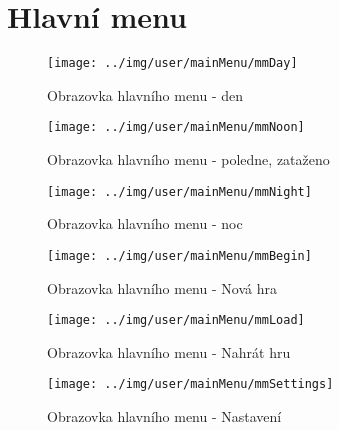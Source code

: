 
\section{Hlavní menu}



\begin{figure}[h!]\centering
\texttt{[image: ../img/user/mainMenu/mmDay]}

\caption{Obrazovka hlavního menu - den}
\label{fig:user_mainMenu_mmDay}

\end{figure}

\begin{figure}[h!]\centering
\texttt{[image: ../img/user/mainMenu/mmNoon]}

\caption{Obrazovka hlavního menu - poledne, zataženo}
\label{fig:user_mainMenu_mmNoon}

\end{figure}

\begin{figure}[h!]\centering
\texttt{[image: ../img/user/mainMenu/mmNight]}

\caption{Obrazovka hlavního menu - noc}
\label{fig:user_mainMenu_mmNight}

\end{figure}


\begin{figure}[h!]\centering
\texttt{[image: ../img/user/mainMenu/mmBegin]}

\caption{Obrazovka hlavního menu - Nová hra}
\label{fig:user_mainMenu_mmBegin}

\end{figure}

\begin{figure}[h!]\centering
\texttt{[image: ../img/user/mainMenu/mmLoad]}

\caption{Obrazovka hlavního menu - Nahrát hru}
\label{fig:user_mainMenu_mmLoad}

\end{figure}


\begin{figure}[h!]\centering
\texttt{[image: ../img/user/mainMenu/mmSettings]}

\caption{Obrazovka hlavního menu - Nastavení}
\label{fig:user_mainMenu_mmSettings}

\end{figure}